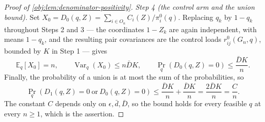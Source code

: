 \begin{proof}[Proof of \cref{obj:lem:denominator-positivity}]
\textit{Step 4 (the control arm and the union bound).} Set \(X_0=D_0(q,Z)=\sum_{i\in O_n}C_i(Z)/\pi_i^0(q)\). Replacing \(q_k\) by \(1-q_k\) throughout Steps 2 and 3 — the coordinates \(1-Z_k\) are again independent, with means \(1-q_k\), and the resulting pair covariances are the control loads \(r_{ij}^0(G_n,q)\), bounded by \(K\) in Step 1 — gives
\[
\mathbb E_q[X_0]=n,
\qquad
\operatorname{Var}_q(X_0)\le n\bar DK,
\qquad
\Pr_q\!\left(D_0(q,Z)=0\right)\le\frac{\bar DK}{n}.
\]
Finally, the probability of a union is at most the sum of the probabilities, so
\[
\Pr_q\!\left(D_1(q,Z)=0\ \text{or}\ D_0(q,Z)=0\right)
\le\frac{\bar DK}{n}+\frac{\bar DK}{n}
=\frac{2\bar DK}{n}
=\frac{C}{n}.
\]
The constant \(C\) depends only on \(\epsilon,\bar d,\bar D\), so the bound holds for every feasible \(q\) at every \(n\ge1\), which is the assertion.
\end{proof}
